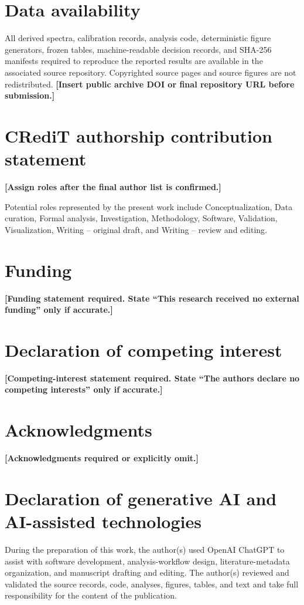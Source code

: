 \section*{Data availability}

All derived spectra, calibration records, analysis code, deterministic figure generators, frozen tables, machine-readable decision records, and SHA-256 manifests required to reproduce the reported results are available in the associated source repository. Copyrighted source pages and source figures are not redistributed. \textbf{[Insert public archive DOI or final repository URL before submission.]}

\section*{CRediT authorship contribution statement}

\textbf{[Assign roles after the final author list is confirmed.]}

Potential roles represented by the present work include Conceptualization, Data curation, Formal analysis, Investigation, Methodology, Software, Validation, Visualization, Writing -- original draft, and Writing -- review and editing.

\section*{Funding}

\textbf{[Funding statement required. State ``This research received no external funding'' only if accurate.]}

\section*{Declaration of competing interest}

\textbf{[Competing-interest statement required. State ``The authors declare no competing interests'' only if accurate.]}

\section*{Acknowledgments}

\textbf{[Acknowledgments required or explicitly omit.]}

\section*{Declaration of generative AI and AI-assisted technologies}

During the preparation of this work, the author(s) used OpenAI ChatGPT to assist with software development, analysis-workflow design, literature-metadata organization, and manuscript drafting and editing. The author(s) reviewed and validated the source records, code, analyses, figures, tables, and text and take full responsibility for the content of the publication.
